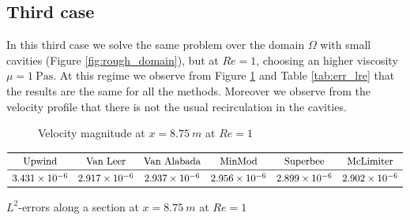 \documentclass[11pt, a4paper]{article}
\theoremstyle{definition}
\begin{document}
\FloatBarrier
\subsection{Third case}

In this third case we solve the same problem over the domain $\Omega$ with 
small cavities (Figure \ref{fig:rough_domain}), but at $Re=1$, choosing an 
higher 
viscosity $\mu=\SI{1}{\pascal\second}$. At this regime we observe from Figure 
\ref{fig:line_comp_lre} and Table \ref{tab:err_lre} that the results are the 
same for all the methods. Moreover we observe from the velocity profile that 
there is not the usual recirculation in the cavities.
\begin{figure}[h]
	\centering
	
	\caption{Velocity magnitude at $ x = \SI{8.75}{m}$ at $Re = 1$}
	\label{fig:line_comp_lre}
\end{figure}

\begin{table}[h]
	\scriptsize
	\centering
	\[
	\begin{array}{cccccc}
	\toprule
	\text{Upwind} & \text{Van Leer} & \text{Van Alabada} & \text{MinMod} & 
	\text{Superbee} & \text{McLimiter} \\ 
	\midrule
	3.431 \times 10^{-6} & 2.917 \times 10^{-6} & 2.937 \times 10^{-6} & 2.956 
	\times 10^{-6} & 2.899 \times 10^{-6} & 2.902 \times 10^{-6}\\
	\bottomrule
	\end{array}
	\]
	\caption{$L^2$-errors along a section at $x=\SI{8.75}{m}$ at $Re=1$}
	\label{tab:err_lre}
\end{table}

\FloatBarrier
\end{document}
